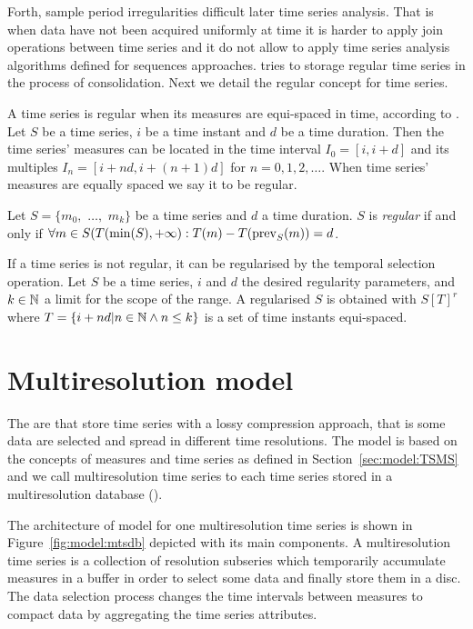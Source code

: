 Forth, sample period irregularities difficult later time series
analysis. That is when data have not been acquired uniformly at time it
is harder to apply join operations between time series and it do not
allow to apply time series analysis algorithms defined for sequences
approaches.   tries to storage regular time series in the
process of consolidation.  Next we detail the regular concept for time
series.


A time series is regular when its measures are equi-spaced in time,
according to \cite{last:hetland}. Let $S$ be a time series, $i$
be a time instant and $d$ be a time duration. Then the time
series' measures can be located in the time interval $I_0=[i,
i+d]$ and its multiples $I_n=[i+nd, i+(n+1)d]$
for $n=0,1,2,\ldots$. When time series' measures are equally spaced we
say it to be regular.

\begin{definition}
  Let $S=\{m_0,$ $\ldots,$ $m_k\}$ be a time series and $d$ a time
  duration. $S$ is \emph{regular} if and only if $\forall m \in
  S(T(\min(S),+\infty):T(m) - T(\operatorname*{prev}_S(m)) = d$.
\end{definition}


If a time series is not regular, it can be regularised by the temporal
selection operation. Let $S$ be a time series, $i$ and $d$ the
desired regularity parameters, and $k\in\mathbb{N}$ a limit for the scope of
the range.  A regularised $S$ is obtained with $S[T]^r$ where $T =
\{i+nd | n\in\mathbb{N} \wedge n\leq k \}$ is a set of time instants equi-spaced.





\section{Multiresolution model}
\label{sec:MTSMS}


The  are  that store time series with a lossy
compression approach, that is some data are selected and spread
in different time resolutions. The  model is based on the
concepts of measures and time series as defined in
Section~\ref{sec:model:TSMS} and we call multiresolution time series
to each time series stored in a multiresolution database
().


The architecture of  model for one multiresolution time series is
shown in Figure~\ref{fig:model:mtsdb} depicted with its main
components.  A multiresolution time series is a collection of
resolution subseries which temporarily accumulate measures in a buffer
in order to select some data and finally store them in a
disc. The data selection process changes the time intervals
between measures to compact data by aggregating the time series
attributes.

